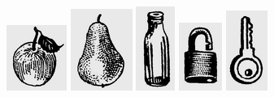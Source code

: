 \documentclass[a5paper]{article}
\begin{document}
 \includegraphics[width=0.7709in,height=0.8437in]{MuhammadBagauddinlatinized-img315.png}   \includegraphics[width=0.7917in,height=1.052in]{MuhammadBagauddinlatinized-img316.png}   \includegraphics[width=0.5in,height=1.0835in]{MuhammadBagauddinlatinized-img317.png}   \includegraphics[width=0.552in,height=0.8752in]{MuhammadBagauddinlatinized-img318.png}   \includegraphics[width=0.5311in,height=1.0311in]{MuhammadBagauddinlatinized-img319.png} 
\end{document}
